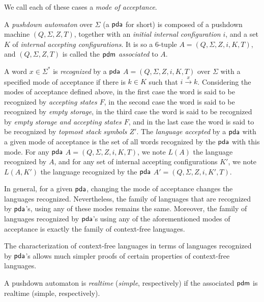 We call each of these cases a \emph{mode of acceptance}.

A \emph{pushdown automaton} over $\Sigma$ (a \index{$\pda$}$\pda$ for short) is composed of a pushdown machine $(Q, \Sigma, Z, T)$, together with an \emph{initial internal configuration} $i$, and a set $K$ of \emph{internal accepting configurations}. It is so a $6$-tuple $A = (Q, \Sigma, Z, i, K, T)$, and $(Q, \Sigma, Z, T)$ is called the \emph{$\textup{\sf pdm}$ associated} to $A$.

A word $x \in \Sigma^*$ is \emph{recognized} by a $\pda$ $A = (Q, \Sigma, Z, i, K ,T)$ over $\Sigma$ with a specified  mode of acceptance if there is $k \in K$ such that $i \xrightarrow{x} k$. Considering  the modes of acceptance defined above, in the first case the word is said to be recognized by  \emph{accepting states $F$}, in the second case the word is said to be recognized by \emph{empty storage}, in the third case the word is said to be recognized by \emph{empty storage and accepting states $F$}, and in the last case the word is said to be recognized by \emph{topmost stack symbols $Z'$}. The \emph{language accepted} by a $\pda$ with a given mode of acceptance is the set of all words recognized by the $\pda$ with this mode. For any $\pda$ $A = (Q, \Sigma, Z, i, K, T)$, we note $L(A)$ the language recognized by $A$, and for any set of internal accepting configurations $K'$, we note $L(A, K')$ the language recognized by the $\pda$ $A' = (Q, \Sigma, Z, i, K', T)$.

In general, for a given $\pda$, changing the mode of acceptance changes the languages recognized. Nevertheless, the family of languages that are recognized by $\pda$'s, using any of these modes remains the same. Moreover, the family of languages recognized by $\pda$'s using any of the aforementioned modes of acceptance is exactly the family of context-free languages.

The characterization of context-free languages in terms of languages recognized by $\pda$'s allows much simpler proofs of certain properties of context-free languages.

A pushdown automaton is \emph{realtime} (\emph{simple}, respectively) if the associated $\textup{\sf pdm}$ is realtime (simple, respectively).

